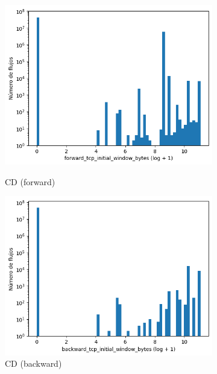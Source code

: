 \begin{figure}[H]
    \centering
    \begin{subfigure}[b]{0.26\textwidth}
        \centering
        \includegraphics[width=\textwidth]{media/packet_pincer_cicddos/forward_tcp_initial_window_bytes_log_x_log_y.png}
        \caption{CD (forward)}
        \includegraphics[width=\textwidth]{media/packet_pincer_cicddos/backward_tcp_initial_window_bytes_log_x_log_y.png}
        \caption{CD (backward)}
    \end{subfigure}
    \hfill
    \begin{subfigure}[b]{0.26\textwidth}
        \centering

\end{subfigure}
\end{figure}

